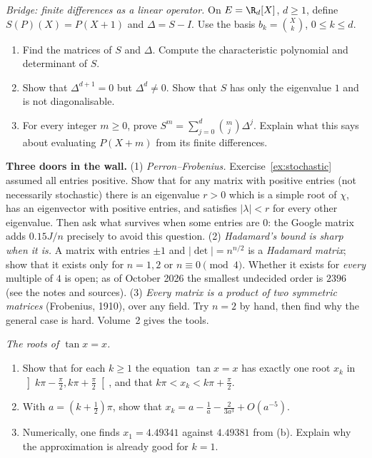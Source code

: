 \begin{exercise}[$\star\star$]\label{ex:bridge-translation}
\emph{Bridge: finite differences as a linear operator.} On $E=\R_d[X]$, $d\ge1$, define $S(P)(X)=P(X+1)$ and $\Delta=S-I$. Use the basis $b_k=\binom Xk$, $0\le k\le d$.
\begin{enumerate}[label=(\alph*)]
\item Find the matrices of $S$ and $\Delta$. Compute the characteristic polynomial and determinant of $S$.
\item Show that $\Delta^{d+1}=0$ but $\Delta^d\ne0$. Show that $S$ has only the eigenvalue $1$ and is not diagonalisable.
\item For every integer $m\ge0$, prove $S^m=\sum_{j=0}^d\binom mj\Delta^j$. Explain what this says about evaluating $P(X+m)$ from its finite differences.
\end{enumerate}
\end{exercise}

\begin{challenge}
\textbf{Three doors in the wall.} (1) \emph{Perron--Frobenius.} Exercise~\ref{ex:stochastic} assumed all entries positive. Show that for any matrix with positive entries (not necessarily stochastic) there is an eigenvalue $r>0$ which is a simple root of $\chi$, has an eigenvector with positive entries, and satisfies $|\lambda|<r$ for every other eigenvalue. Then ask what survives when some entries are $0$: the Google matrix adds $0.15J/n$ precisely to avoid this question.
(2) \emph{Hadamard's bound is sharp when it is.} A matrix with entries $\pm1$ and $|\det|=n^{n/2}$ is a \emph{Hadamard matrix}; show that it exists only for $n=1,2$ or $n\equiv0\pmod 4$. Whether it exists for \emph{every} multiple of $4$ is open; as of October 2026 the smallest undecided order is $2396$ (see the notes and sources).
(3) \emph{Every matrix is a product of two symmetric matrices} (Frobenius, 1910), over any field. Try $n=2$ by hand, then find why the general case is hard. Volume~2 gives the tools.
\end{challenge}

\begin{exercise}[$\star$]\label{pb:tanroots}
\emph{The roots of $\tan x=x$.}
\begin{enumerate}[label=(\alph*)]
\item Show that for each $k\ge1$ the equation $\tan x=x$ has exactly one root $x_k$ in $\left]k\pi-\frac\pi2,k\pi+\frac\pi2\right[$, and that $k\pi<x_k<k\pi+\frac\pi2$.
\item With $a=(k+\frac12)\pi$, show that $x_k=a-\frac1a-\frac2{3a^3}+O(a^{-5})$.
\item Numerically, one finds $x_1=4.49341$ against $4.49381$ from (b). Explain why the approximation is already good for $k=1$.
\end{enumerate}
\end{exercise}

